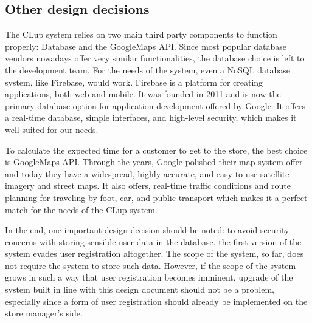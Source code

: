 \subsection{Other design decisions}
\hspace{\parindent}The CLup system relies on two main third party components to function properly: Database and the GoogleMaps API. Since most popular database vendors nowadays offer very similar functionalities, the database choice is left to the development team. For the needs of the system, even a NoSQL database system, like Firebase, would work. Firebase is a platform for creating applications, both web and mobile. It was founded in 2011 and is now the primary database option for application development offered by Google. It offers a real-time database, simple interfaces, and high-level security, which makes it well suited for our needs. \newline

To calculate the expected time for a customer to get to the store, the best choice is GoogleMaps API. Through the years, Google polished their map system offer and today they have a widespread, highly accurate, and easy-to-use satellite imagery and street maps. It also offers, real-time traffic conditions and route planning for traveling by foot, car, and public transport which makes it a perfect match for the needs of the CLup system.\newline 

In the end, one important design decision should be noted: to avoid security concerns with storing sensible user data in the database, the first version of the system evades user registration altogether. The scope of the system, so far, does not require the system to store such data. However, if the scope of the system grows in such a way that user registration becomes imminent, upgrade of the system built in line with this design document should not be a problem, especially since a form of user registration should already be implemented on the store manager's side. 
\newpage





